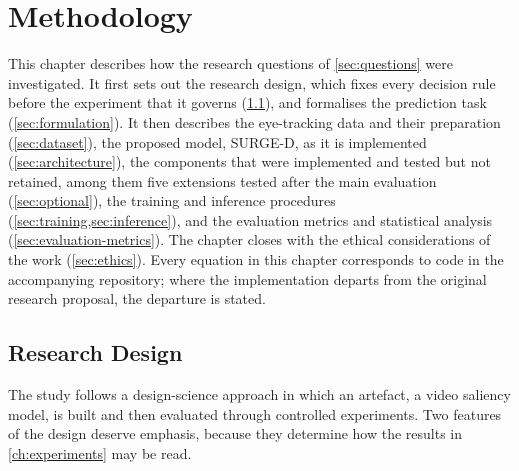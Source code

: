 \chapter{Methodology}\label{ch:methodology}


This chapter describes how the research questions of \cref{sec:questions}
were investigated. It first sets out the research design, which fixes every
decision rule before the experiment that it governs
(\cref{sec:design}), and formalises the prediction task
(\cref{sec:formulation}). It then describes the eye-tracking data and their
preparation (\cref{sec:dataset}), the proposed model, SURGE-D, as it is
implemented (\cref{sec:architecture}), the components that were implemented
and tested but not retained, among them five extensions tested after the main
evaluation (\cref{sec:optional}), the training and inference
procedures (\cref{sec:training,sec:inference}), and the evaluation metrics
and statistical analysis (\cref{sec:evaluation-metrics}). The chapter closes
with the ethical considerations of the work (\cref{sec:ethics}). Every
equation in this chapter corresponds to code in the accompanying repository;
where the implementation departs from the original research proposal, the
departure is stated.

\section{Research Design}\label{sec:design}

The study follows a design-science approach in which an artefact, a video
saliency model, is built and then evaluated through controlled experiments.
Two features of the design deserve emphasis, because they determine how the
results in \cref{ch:experiments} may be read.

